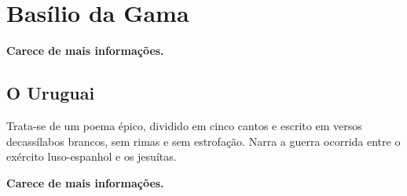 \section{Basílio da Gama}

\textbf{Carece de mais informações.}

\subsection{O Uruguai}

Trata-se de um poema épico, dividido em cinco cantos e escrito em versos decassílabos brancos, sem rimas e sem estrofação. Narra a guerra ocorrida entre o exército luso-espanhol e os jesuítas.

\textbf{Carece de mais informações.}